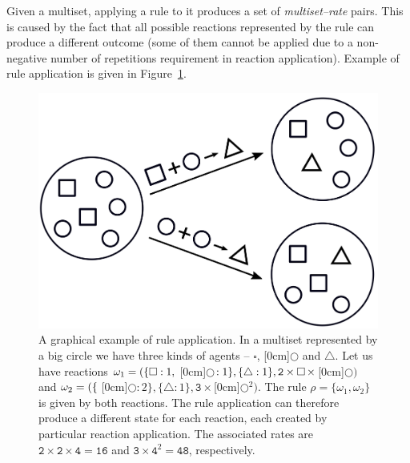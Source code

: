 \documentclass[11pt,a4paper]{report}
\begin{document}
Given a multiset, applying a rule to it produces a set of \emph{multiset--rate} pairs. This is caused by the fact that all possible reactions represented by the rule can produce a different outcome (some of them cannot be applied due to a non-negative number of repetitions requirement in reaction application). Example of rule application is given in Figure~\ref{rule_example}.

\begin{figure}[!h]
	\begin{center}
		\includegraphics[scale=0.2]{images/rule.png}
	\end{center}
	\caption{A graphical example of rule application. In a multiset represented by a big circle we have three kinds of agents -- {\large $\square$}, \raisebox{0.04cm}[0cm]{{$\bigcirc$}} and $\bigtriangleup$. Let us have reactions $\omega_1 = (\{{\large \square}:1,\hspace{0.1cm} $\raisebox{0.04cm}[0cm]{{$\bigcirc$}}\hspace{0.1cm}$:1\}, \{\bigtriangleup:1\}, \mathtt{2}\times{\large \square}\hspace{0.05cm}\times$\hspace{0.05cm}\raisebox{0.04cm}[0cm]{{$\bigcirc$}}$)$ and $\omega_2 = (\{\hspace{0.1cm} $\raisebox{0.04cm}[0cm]{{$\bigcirc$}}\hspace{0.1cm}$:2\}, \{\bigtriangleup:1\}, \mathtt{3}\times$\hspace{0.05cm}\raisebox{0.04cm}[0cm]{{$\bigcirc$}}$^2)$. The rule $\rho = \{ \omega_1, \omega_2 \}$ is given by both reactions. The rule application can therefore produce a different state for each reaction, each created by particular reaction application. The associated rates are $\mathtt{2} \times \mathtt{2} \times \mathtt{4} = \mathtt{16}$ and $\mathtt{3} \times \mathtt{4}^2 = \mathtt{48}$, respectively.}\label{rule_example}
\end{figure}
\end{document}
